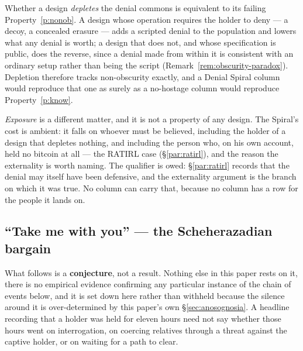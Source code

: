 \begin{corollary}\label{cor:spiral-equiv}
Whether a design \emph{depletes} the denial commons is equivalent to its failing
Property~\ref{p:nonob}. A design whose operation requires the holder to deny --- a
decoy, a concealed erasure --- adds a scripted denial to the population and lowers what
any denial is worth; a design that does not, and whose specification is public, does the
reverse, since a denial made from within it is consistent with an ordinary setup rather
than being the script (Remark~\ref{rem:obscurity-paradox}). Depletion therefore tracks
non-obscurity exactly, and a Denial Spiral column would reproduce that one as surely as
a no-hostage column would reproduce Property~\ref{p:know}.

\emph{Exposure} is a different matter, and it is not a property of any design. The
Spiral's cost is ambient: it falls on whoever must be believed, including the holder of
a design that depletes nothing, and including the person who, on his own account,
held no bitcoin at all --- the RATIRL case (\S\ref{par:ratirl}), and the reason the
externality is worth naming. The qualifier is owed: \S\ref{par:ratirl} records that the
denial may itself have been defensive, and the externality argument is the branch on
which it was true. No column can carry that, because no column has a row for the people it
lands on.
\end{corollary}

\subsection{``Take me with you'' --- the Scheherazadian bargain}
\label{sub:scheherazade}

\noindent What follows is a \textbf{conjecture}, not a result. Nothing else in
this paper rests on it, there is no empirical evidence confirming any particular
instance of the chain of events below, and it is set down here rather than
withheld because the silence around it is over-determined by this paper's own
\S\ref{sec:anosognosia}. A headline recording that a holder was held for eleven
hours need not say whether those hours went on interrogation, on coercing
relatives through a threat against the captive holder, or on waiting for a path
to clear.

